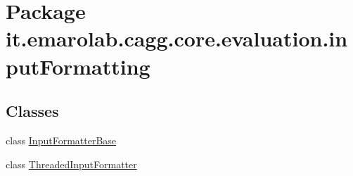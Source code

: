 \hypertarget{namespaceit_1_1emarolab_1_1cagg_1_1core_1_1evaluation_1_1inputFormatting}{\section{Package it.\-emarolab.\-cagg.\-core.\-evaluation.\-input\-Formatting}
\label{namespaceit_1_1emarolab_1_1cagg_1_1core_1_1evaluation_1_1inputFormatting}
}
\subsection*{Classes}
\begin{DoxyCompactItemize}
\item 
class \hyperlink{classit_1_1emarolab_1_1cagg_1_1core_1_1evaluation_1_1inputFormatting_1_1InputFormatterBase}{Input\-Formatter\-Base}
\item 
class \hyperlink{classit_1_1emarolab_1_1cagg_1_1core_1_1evaluation_1_1inputFormatting_1_1ThreadedInputFormatter}{Threaded\-Input\-Formatter}
\end{DoxyCompactItemize}
